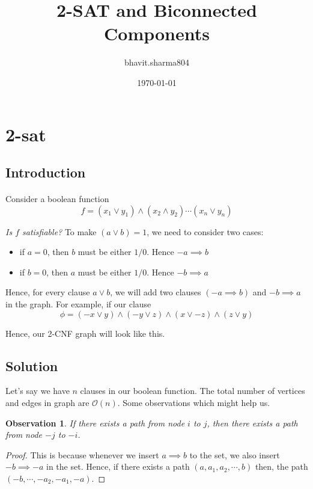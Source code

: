 \documentclass{article}
\title{2-SAT and Biconnected Components}
\author{bhavit.sharma804 }
\date{\today}
\newtheorem{observation}{Observation}[section]
\theoremstyle{definition}
\begin{document}
\maketitle

\section{2-sat}
\subsection{Introduction}
\paragraph{} Consider a boolean function
\[
	f = (x_1 \lor y_1)\land(x_2 \land y_2) \cdots (x_n \lor y_n)
\]

\par \textit{Is $f$ satisfiable?}
To make $(a \lor b) = 1$, we need to consider two cases:
\begin{itemize}
	\item if $a = 0$, then $b$ must be either $1/0$. Hence $-a \implies b$
	\item if $b = 0$, then $a$ must be either $1/0$. Hence $-b \implies a$
\end{itemize}

Hence, for every clause $a \lor b$, we will add two clauses $(-a \implies b)$ and $-b \implies a$
in the graph. For example, if our clause
\[
    \phi = (-x \lor y) \land (-y \lor z) \land (x \lor -z) \land (z \lor y)
\]

Hence, our 2-CNF graph will look like this.\\

\subsection{Solution}
Let's say we have $n$ clauses in our boolean function. The total number of vertices and edges in
graph are $\mathcal{O}(n)$. Some observations which might help us.

\begin{observation}
    \label{Obs1}
    If there exists a path from node $i$ to $j$, then there exists a path from node
    $-j$ to $-i$.
\end{observation}

\begin{proof}
    This is because whenever we insert $a \implies b$ to the set, we also insert
    $-b \implies -a$ in the set. Hence, if there exists a path $(a, a_1, a_2, \cdots, b)$
    then, the path $(-b, \cdots, -a_2, -a_1, -a)$.
\end{proof}
\end{document}
